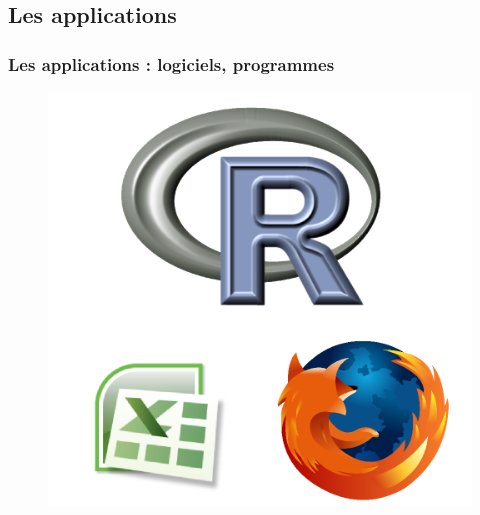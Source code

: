 \documentclass[table,svgnames,hyperref={pdfpagemode=FullScreen}]{beamer}
\begin{document}
\subsection{Les applications}
\begin{frame}
	\frametitle{Les applications : logiciels, programmes}
	\begin{figure}[h]
		\begin{center}
		  \includegraphics[scale=0.45]{image/software.png}
		\end{center}
	\end{figure}
\end{frame}
\end{document}
